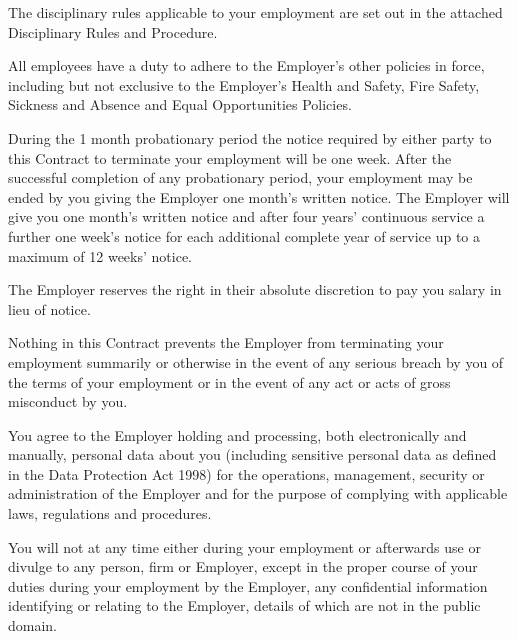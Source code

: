 \documentclass[a4paper,11pt,onecolumn ]{article}
\begin{document}
\begin{legal}
\item {}
The disciplinary rules applicable to your employment are set out in the attached
Disciplinary Rules and Procedure.

\item {}
All employees have a duty to adhere to the Employer’s other policies in force,
including but not exclusive to the Employer’s Health and Safety, Fire Safety, Sickness
and Absence and Equal Opportunities Policies.

\item {}
\begin{legal}
  \item During the 1 month probationary period the notice required by either party to
  this Contract to terminate your employment will be one week.
  After the successful completion of any probationary period, your employment may
  be ended by you giving the Employer one month’s written notice. The Employer will
  give you one month’s written notice and after four years’ continuous service a further
  one week’s notice for each additional complete year of service up to a maximum of 12
  weeks’ notice.
  \item The Employer reserves the right in their absolute discretion to pay you salary
  in lieu of notice.
  \item Nothing in this Contract prevents the Employer from terminating your
  employment summarily or otherwise in the event of any serious breach by you
  of the terms of your employment or in the event of any act or acts of gross
  misconduct by you.
\end{legal}

\item {}
You agree to the Employer holding and processing, both electronically and
manually, personal data about you (including sensitive personal data as defined in
the Data Protection Act 1998) for the operations, management, security or
administration of the Employer and for the purpose of complying with applicable
laws, regulations and procedures.

\item {}
You will not at any time either during your employment or afterwards use or
divulge to any person, firm or Employer, except in the proper course of your duties
during your employment by the Employer, any confidential information identifying
or relating to the Employer, details of which are not in the public domain.


\end{legal}
\end{document}
